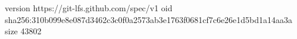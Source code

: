 version https://git-lfs.github.com/spec/v1
oid sha256:310b099e8e087d3462c3c0f0a2573ab3e1763f0681cf7c6e26e1d5bd1a14aa3a
size 43802
